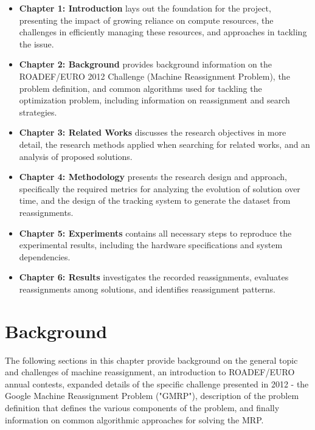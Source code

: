 \documentclass[a4paper,12pt]{Classes/RoboticsLaTeX}
\begin{document}
\begin{itemize}

\item \textbf{Chapter 1: Introduction} lays out the foundation for the
project, presenting the impact of growing reliance on compute resources,
the challenges in efficiently managing these resources, and approaches
in tackling the issue.

\item \textbf{Chapter 2: Background} provides background information on the
ROADEF/EURO 2012 Challenge (Machine Reassignment Problem), the problem
definition, and common algorithms used for tackling the optimization
problem, including information on reassignment and search strategies.

\item \textbf{Chapter 3: Related Works} discusses the research objectives in
more detail, the research methods applied when searching for related
works, and an analysis of proposed solutions.

\item \textbf{Chapter 4: Methodology} presents the research design and
approach, specifically the required metrics for analyzing the evolution
of solution over time, and the design of the tracking system to generate
the dataset from reassignments.

\item \textbf{Chapter 5: Experiments} contains all necessary steps to
reproduce the experimental results, including the hardware specifications and system dependencies.

\item \textbf{Chapter 6: Results} investigates the recorded reassignments,
evaluates reassignments among solutions, and identifies reassignment
patterns.

\end{itemize}

\chapter{Background} \label{chap:background}

The following sections in this chapter provide background on the general topic and challenges of machine reassignment, an introduction to ROADEF/EURO annual contests, expanded details of the specific challenge presented in 2012 - the Google Machine Reassignment Problem ("GMRP"), description of the problem definition that defines the various components of the problem, and finally information on common algorithmic approaches for solving the MRP.
\end{document}
